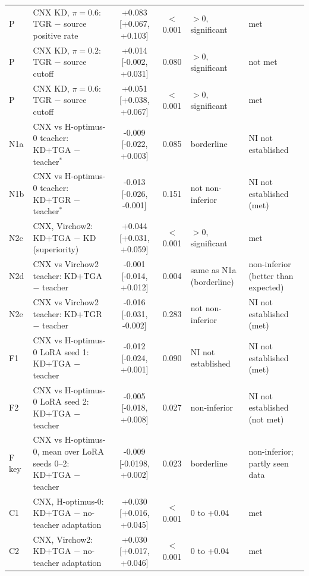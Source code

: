 \begin{table}[htbp]
{\begin{tabular}{@{}l>{\raggedright\arraybackslash}p{5.0cm}ccp{1.8cm}>{\raggedright\arraybackslash}p{2.4cm}@{}}
P & CNX KD, $\pi=0.6$: TGR $-$ source positive rate & +0.083 [+0.067, +0.103] & $<$0.001 & $>0$, significant & met \\
P & CNX KD, $\pi=0.2$: TGR $-$ source cutoff & +0.014 [-0.002, +0.031] & 0.080 & $>0$, significant & not met \\
P & CNX KD, $\pi=0.6$: TGR $-$ source cutoff & +0.051 [+0.038, +0.067] & $<$0.001 & $>0$, significant & met \\
N1a & CNX vs H-optimus-0 teacher: KD+TGA $-$ teacher$^\ast$ & -0.009 [-0.022, +0.003] & 0.085 & borderline & NI not established \\
N1b & CNX vs H-optimus-0 teacher: KD+TGR $-$ teacher$^\ast$ & -0.013 [-0.026, -0.001] & 0.151 & not non-inferior & NI not established (met) \\
N2c & CNX, Virchow2: KD+TGA $-$ KD (superiority) & +0.044 [+0.031, +0.059] & $<$0.001 & $>0$, significant & met \\
N2d & CNX vs Virchow2 teacher: KD+TGA $-$ teacher & -0.001 [-0.014, +0.012] & 0.004 & same as N1a (borderline) & non-inferior (better than expected) \\
N2e & CNX vs Virchow2 teacher: KD+TGR $-$ teacher & -0.016 [-0.031, -0.002] & 0.283 & not non-inferior & NI not established (met) \\
F1 & CNX vs H-optimus-0 LoRA seed 1: KD+TGA $-$ teacher & -0.012 [-0.024, +0.001] & 0.090 & NI not established & NI not established (met) \\
F2 & CNX vs H-optimus-0 LoRA seed 2: KD+TGA $-$ teacher & -0.005 [-0.018, +0.008] & 0.027 & non-inferior & NI not established (not met) \\
F key & CNX vs H-optimus-0, mean over LoRA seeds 0--2: KD+TGA $-$ teacher & -0.009 [-0.0198, +0.002] & 0.023 & borderline & non-inferior; partly seen data \\
C1 & CNX, H-optimus-0: KD+TGA $-$ no-teacher adaptation & +0.030 [+0.016, +0.045] & $<$0.001 & 0 to +0.04 & met \\
C2 & CNX, Virchow2: KD+TGA $-$ no-teacher adaptation & +0.030 [+0.017, +0.046] & $<$0.001 & 0 to +0.04 & met \\
\bottomrule
\end{tabular}
}
\end{table}
